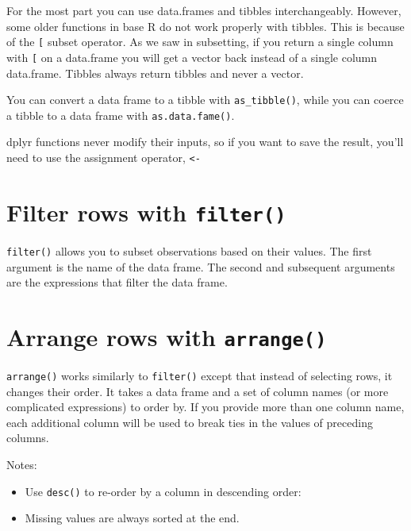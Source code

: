 \documentclass[]{book}
\providecommand{\tightlist}{%
  \setlength{\itemsep}{0pt}\setlength{\parskip}{0pt}}
\theoremstyle{definition}
\theoremstyle{definition}
\theoremstyle{definition}
\theoremstyle{remark}
\let\BeginKnitrBlock\begin \let\EndKnitrBlock\end
\begin{document}
For the most part you can use data.frames and tibbles interchangeably.
However, some older functions in base R do not work properly with
tibbles. This is because of the \texttt{{[}} subset operator. As we saw
in subsetting, if you return a single column with \texttt{{[}} on a
data.frame you will get a vector back instead of a single column
data.frame. Tibbles always return tibbles and never a vector.

You can convert a data frame to a tibble with \texttt{as\_tibble()},
while you can coerce a tibble to a data frame with
\texttt{as.data.fame()}.

\BeginKnitrBlock{rmdimportant}
dplyr functions never modify their inputs, so if you want to save the
result, you'll need to use the assignment operator,
\texttt{\textless{}-}
\EndKnitrBlock{rmdimportant}

\hypertarget{filter-rows-with-filter}{%
\section{\texorpdfstring{Filter rows with
\texttt{filter()}}{Filter rows with filter()}}\label{filter-rows-with-filter}}

\texttt{filter()} allows you to subset observations based on their
values. The first argument is the name of the data frame. The second and
subsequent arguments are the expressions that filter the data frame.

\hypertarget{arrange-rows-with-arrange}{%
\section{\texorpdfstring{Arrange rows with
\texttt{arrange()}}{Arrange rows with arrange()}}\label{arrange-rows-with-arrange}}

\texttt{arrange()} works similarly to \texttt{filter()} except that
instead of selecting rows, it changes their order. It takes a data frame
and a set of column names (or more complicated expressions) to order by.
If you provide more than one column name, each additional column will be
used to break ties in the values of preceding columns.

Notes:

\begin{itemize}
\tightlist
\item
  Use \texttt{desc()} to re-order by a column in descending order:
\item
  Missing values are always sorted at the end.
\end{itemize}
\end{document}
